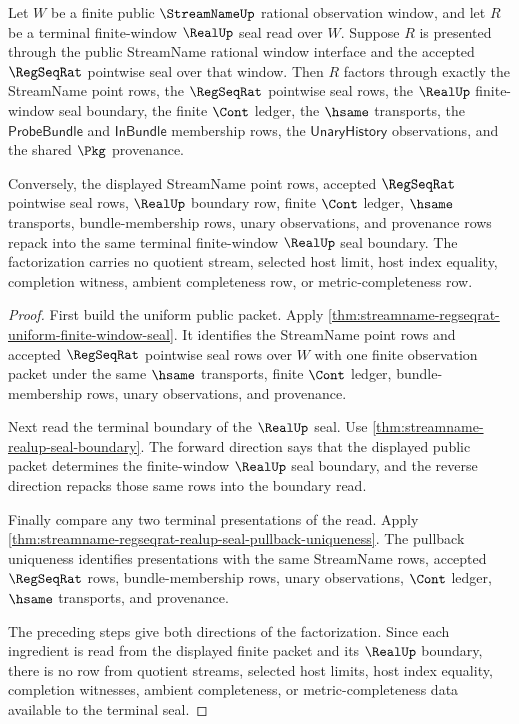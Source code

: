 \begin{theorem}
\label{thm:streamname-regseqrat-realup-terminal-pullback-factorization}
Let $W$ be a finite public $\StreamNameUp$ rational observation window, and
let $R$ be a terminal finite-window $\RealUp$ seal read over $W$. Suppose $R$
is presented through the public StreamName rational window interface and the
accepted $\RegSeqRat$ pointwise seal over that window. Then $R$ factors
through exactly the StreamName point rows, the $\RegSeqRat$ pointwise seal
rows, the $\RealUp$ finite-window seal boundary, the finite $\Cont$ ledger,
the $\hsame$ transports, the $\mathsf{ProbeBundle}$ and
$\mathsf{InBundle}$ membership rows, the $\mathsf{UnaryHistory}$
observations, and the shared $\Pkg$ provenance.

Conversely, the displayed StreamName point rows, accepted $\RegSeqRat$
pointwise seal rows, $\RealUp$ boundary row, finite $\Cont$ ledger,
$\hsame$ transports, bundle-membership rows, unary observations, and
provenance rows repack into the same terminal finite-window $\RealUp$ seal
boundary. The factorization carries no quotient stream, selected host limit,
host index equality, completion witness, ambient completeness row, or
metric-completeness row.
\end{theorem}
\begin{proof}
First build the uniform public packet. Apply
\autoref{thm:streamname-regseqrat-uniform-finite-window-seal}. It identifies
the StreamName point rows and accepted $\RegSeqRat$ pointwise seal rows over
$W$ with one finite observation packet under the same $\hsame$ transports,
finite $\Cont$ ledger, bundle-membership rows, unary observations, and
provenance.

Next read the terminal boundary of the $\RealUp$ seal. Use
\autoref{thm:streamname-realup-seal-boundary}. The forward direction says that
the displayed public packet determines the finite-window $\RealUp$ seal
boundary, and the reverse direction repacks those same rows into the boundary
read.

Finally compare any two terminal presentations of the read. Apply
\autoref{thm:streamname-regseqrat-realup-seal-pullback-uniqueness}. The
pullback uniqueness identifies presentations with the same StreamName rows,
accepted $\RegSeqRat$ rows, bundle-membership rows, unary observations,
$\Cont$ ledger, $\hsame$ transports, and provenance.

The preceding steps give both directions of the factorization. Since each
ingredient is read from the displayed finite packet and its $\RealUp$ boundary,
there is no row from quotient streams, selected host limits, host index
equality, completion witnesses, ambient completeness, or metric-completeness
data available to the terminal seal.
\end{proof}


